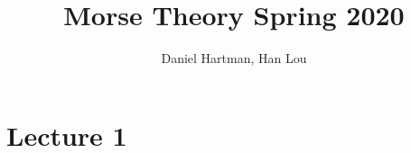 \documentclass{article}
\title{Morse Theory Spring 2020}
\author{Daniel Hartman, Han Lou}
\begin{document}
\maketitle
\newpage
\tableofcontents
\newpage
\section{Lecture 1}

\end{document}
